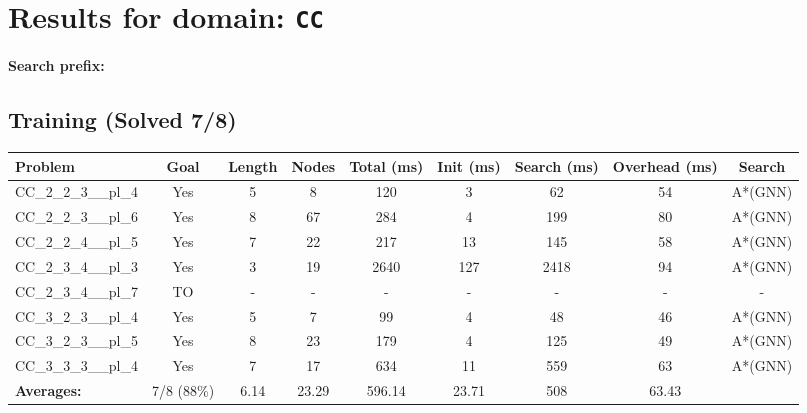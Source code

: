 \documentclass{article}
\begin{document}
\section*{Results for domain: \texttt{CC}}
\textbf{Search prefix:} 
\\[0.5cm]
\subsection*{Training (Solved 7/8)}
\begin{tabular}{lcccccccc}
\toprule
Problem & Goal & Length & Nodes & Total (ms) & Init (ms) & Search (ms) & Overhead (ms) & Search \\
\midrule
CC\_2\_2\_3\_\_pl\_4 & Yes & 5 & 8 & 120 & 3 & 62 & 54 & A*(GNN) \\
CC\_2\_2\_3\_\_pl\_6 & Yes & 8 & 67 & 284 & 4 & 199 & 80 & A*(GNN) \\
CC\_2\_2\_4\_\_pl\_5 & Yes & 7 & 22 & 217 & 13 & 145 & 58 & A*(GNN) \\
CC\_2\_3\_4\_\_pl\_3 & Yes & 3 & 19 & 2640 & 127 & 2418 & 94 & A*(GNN) \\
CC\_2\_3\_4\_\_pl\_7 & TO & - & - & - & - & - & - & - \\
CC\_3\_2\_3\_\_pl\_4 & Yes & 5 & 7 & 99 & 4 & 48 & 46 & A*(GNN) \\
CC\_3\_2\_3\_\_pl\_5 & Yes & 8 & 23 & 179 & 4 & 125 & 49 & A*(GNN) \\
CC\_3\_3\_3\_\_pl\_4 & Yes & 7 & 17 & 634 & 11 & 559 & 63 & A*(GNN) \\
\textbf{Averages:} & 7/8 (88\%) & 6.14 & 23.29 & 596.14 & 23.71 & 508 & 63.43 & \\
\bottomrule
\end{tabular}
\\[0.7cm]
\end{document}
